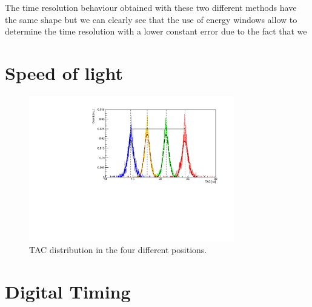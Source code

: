 \documentclass[a4paper,11pt]{article}
\begin{document}
\noindent The time resolution behaviour obtained with these two different methods have the same shape but we can clearly see that the use of energy windows allow to determine the time resolution with a lower constant error due to the fact that we 

\section*{Speed of light}
\lipsum[1]
\begin{figure}[h!]
\centering
\includegraphics[width=0.8\textwidth]{TACoverlayed_dist}
\caption{TAC distribution in the four different positions.}
\end{figure}

\section*{Digital Timing}
\end{document}
